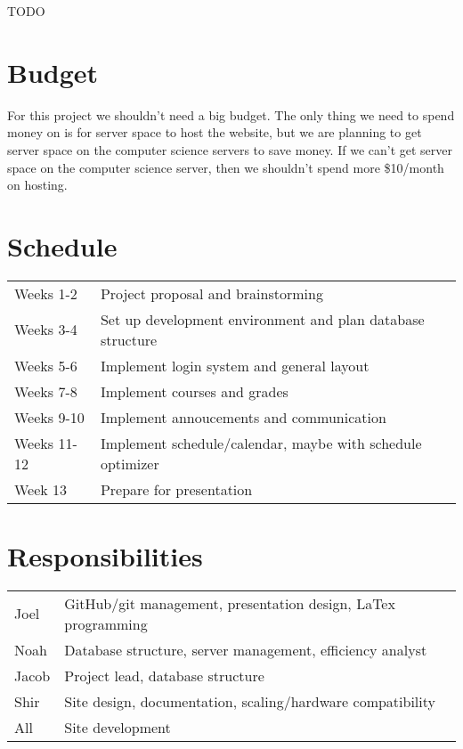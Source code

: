 \documentclass{article}
\begin{document}
TODO

\section{Budget}

For this project we shouldn't need a big budget. The only thing we need to
spend money on is for server space to host the website, but we are planning to
get server space on the computer science servers to save money. If we can't get
server space on the computer science server, then we shouldn't spend more
\$10/month on hosting.

\section{Schedule}

\begin{tabular}{ll}
    Weeks 1-2&Project proposal and brainstorming\\
    Weeks 3-4&Set up development environment and plan database structure\\
    Weeks 5-6&Implement login system and general layout\\
    Weeks 7-8&Implement courses and grades\\
    Weeks 9-10&Implement annoucements and communication\\
    Weeks 11-12&Implement schedule/calendar, maybe with schedule optimizer\\
    Week 13&Prepare for presentation\\
\end{tabular}

\section{Responsibilities}

\begin{tabular}{ll}
    Joel&GitHub/git management, presentation design, LaTex programming\\
    Noah&Database structure, server management, efficiency analyst\\
    Jacob&Project lead, database structure\\
    Shir&Site design, documentation, scaling/hardware compatibility\\
    All&Site development\\
\end{tabular}

\nocite{*}

{}

\end{document}
